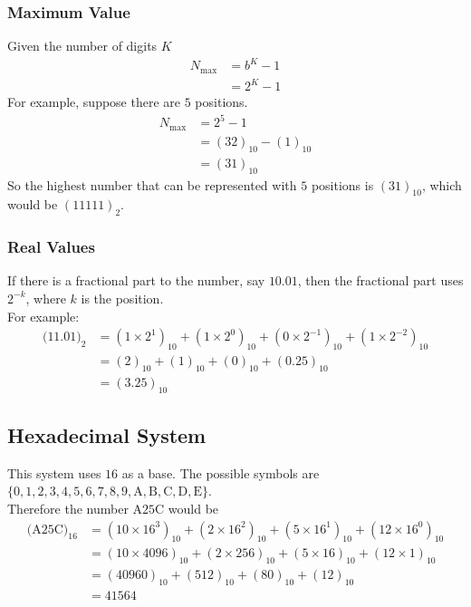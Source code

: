 \documentclass[\main/notes.tex]{subfiles}
\begin{document}
				\subsubsection{Maximum Value}
					Given the number of digits $K$
					\begin{align*}
						N_{\max} &= b^{K} - 1\\
						&= 2^{K} - 1
					\end{align*}
					For example, suppose there are $5$ positions.
					\begin{align*}
						N_{\max} &= 2^{5} - 1\\
						&= (32)_{10} - (1)_{10}\\
						&= (31)_{10}
					\end{align*}
					So the highest number that can be represented with $5$ positions is $(31)_{10}$, which would be $(11111)_{2}$.
				\subsubsection{Real Values}
					If there is a fractional part to the number, say $10.01$, then the fractional part uses $2^{-k}$, where $k$ is the position.\\
					For example:
					\begin{align*}
						\bigl(11.01\bigr)_{2} &= \left(1 \times 2^{1}\right)_{10} + \left(1 \times 2^{0}\right)_{10} + \left(0 \times 2^{-1}\right)_{10} + \left(1 \times 2^{-2}\right)_{10}\\
						&= (2)_{10} + (1)_{10} + (0)_{10} + (0.25)_{10}\\
						&= (3.25)_{10}
					\end{align*}
			\pagebreak
			\subsection{Hexadecimal System}
				This system uses $16$ as a base. The possible symbols are $\{0, 1, 2, 3, 4, 5, 6, 7, 8, 9, \mathrm{A}, \mathrm{B}, \mathrm{C}, \mathrm{D}, \mathrm{E}\}$.\\
				Therefore the number $\mathrm{A}25\mathrm{C}$ would be
				\begin{align*}
					\bigl(\mathrm{A}25\mathrm{C}\bigr)_{16} &= \left(10 \times 16^{3}\right)_{10} + \left(2 \times 16^{2}\right)_{10} + \left(5 \times 16^{1}\right)_{10} + \left(12 \times 16^{0}\right)_{10}\\
					&= (10 \times 4096)_{10} + (2 \times 256)_{10} + (5 \times 16)_{10} + (12 \times 1)_{10}\\
					&= (40960)_{10} + (512)_{10} + (80)_{10} + (12)_{10}\\
					&= 41564
				\end{align*}
\end{document}
